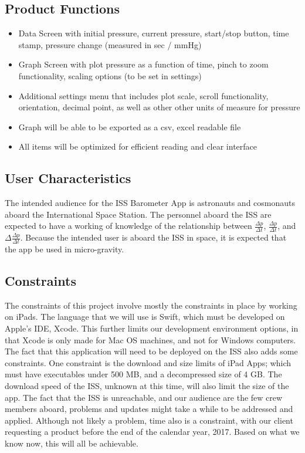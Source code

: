 \documentclass[onecolumn, draftclsnofoot,10pt, compsoc]{IEEEtran}
\def \CapstoneProjectName{ISS Barometer App }
\begin{document}
\subsection{Product Functions}
\begin{itemize}
\item Data Screen with initial pressure, current pressure, start/stop button, time stamp, pressure change (measured in sec / mmHg)
\item Graph Screen with plot pressure as a function of time, pinch to zoom functionality, scaling options (to be set in settings)
\item Additional settings menu that includes plot scale, scroll functionality, orientation, decimal point, as well as other other units of measure for pressure
\item Graph will be able to be exported as a csv, excel readable file
\item All items will be optimized for efficient reading and clear interface
\end{itemize}

\subsection{User Characteristics}
The intended audience for the \CapstoneProjectName is astronauts and cosmonauts aboard the International Space Station.
The personnel aboard the ISS are expected to have a working of knowledge of the relationship between $\frac{\Delta p}{\Delta t}$, $\frac{\Delta p}{\Delta t}$, and $\Delta \frac{\Delta p}{\Delta t}$.
Because the intended user is aboard the ISS in space, it is expected that the app be used in micro-gravity.

\subsection{Constraints}
The constraints of this project involve mostly the constraints in place by working on iPads.
The language that we will use is Swift, which must be developed on Apple's IDE, Xcode.
This further limits our development environment options, in that Xcode is only made for Mac OS machines, and not for Windows computers.
The fact that this application will need to be deployed on the ISS also adds some constraints.
One constraint is the download and size limits of iPad Apps; which must have executables under 500 MB, and a decompressed size of 4 GB.
The download speed of the ISS, unknown at this time, will also limit the size of the app.
The fact that the ISS is unreachable, and our audience are the few crew members aboard, problems and updates might take a while to be addressed and applied.
Although not likely a problem, time also is a constraint, with our client requesting a product before the end of the calendar year, 2017.
Based on what we know now, this will all be achievable.
\end{document}
